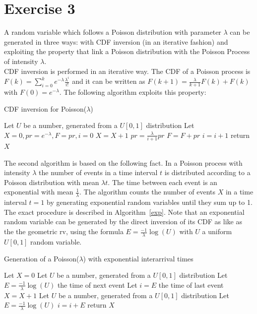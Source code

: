 \documentclass[10pt]{article}
\begin{document}
\section{Exercise 3}
A random variable which follows a Poisson distribution with parameter $\lambda$ can be generated in three ways: with CDF inversion (in an iterative fashion) and exploiting the property that link a Poisson distribution with the Poisson Process of intensity $\lambda$. \\
CDF inversion is performed in an iterative way. The CDF of a Poisson process is $F(k) = \sum_{i = 0}^k e^{-\lambda} \frac{\lambda ^i}{i!}$ and it can be written as $F(k+1) = \frac{\lambda}{k+1} F(k) + F(k)$ with $F(0) = e^{-\lambda}$. The following algorithm exploits this property:

\begin{algorithm}
  \caption{CDF inversion for Poisson($\lambda$)}\label{cdfinvpoi}
  \begin{algorithmic}[1]
    \Procedure{}{}
    \State Let $U$ be a number, generated from a $U[0,1]$ distribution
    \State Let $X = 0, pr = e^{-\lambda}, F = pr, i = 0$
    \State $X = X + 1$
    \State $pr = \frac{\lambda}{i+1}pr$
    \State $F = F + pr$
    \State $i = i + 1$
    \EndWhile
    \State return $X$
    \EndProcedure
  \end{algorithmic}
\end{algorithm}

The second algorithm is based on the following fact. In a Poisson process with intensity $\lambda$ the number of events in a time interval $t$ is distributed according to a Poisson distribution with mean $\lambda t$. The time between each event is an exponential with mean $\frac{1}{\lambda}$. The algorithm counts the number of events $X$ in a time interval $t=1$ by generating exponential random variables until they sum up to 1. The exact procedure is described in Algorithm~\ref{exp}. Note that an exponential random variable can be generated by the direct inversion of its CDF as like as the the geometric rv, using the formula $E = \frac{-1}{\lambda} \log(U)$ with $U$ a uniform $U[0,1]$ random variable.

\begin{algorithm}
  \caption{Generation of a Poisson($\lambda$) with exponential interarrival times}\label{exp}
  \begin{algorithmic}[1]
    \Procedure{}{}
    \State Let $X = 0$
    \State Let $U$ be a number, generated from a $U[0,1]$ distribution
    \State Let $E = \frac{-1}{\lambda} \log(U)$ the time of next event
    \State Let $i = E$ the time of last event
    \State $X = X + 1$
    \State Let $U$ be a number, generated from a $U[0,1]$ distribution
    \State Let $E = \frac{-1}{\lambda} \log(U)$
    \State $i = i + E$
    \EndWhile
    \State return $X$
    \EndProcedure
  \end{algorithmic}
\end{algorithm}
\end{document}
